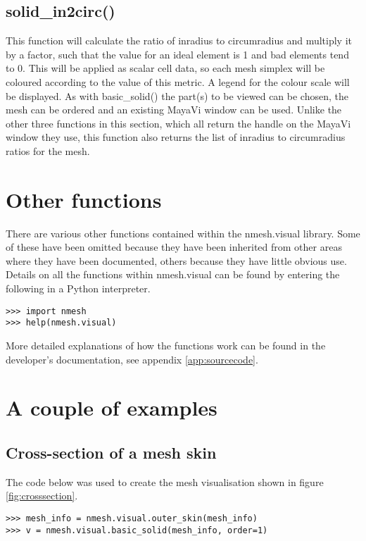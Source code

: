 \subsection{{\ttfamily solid\_in2circ()}}
This function will calculate the ratio of inradius to circumradius and multiply it by a factor, such that the value for an ideal element is 1 and bad elements tend to 0. This will be applied as scalar cell data, so each mesh simplex will be coloured according to the value of this metric. A legend for the colour scale will be displayed. As with {\ttfamily basic\_solid()} the part(s) to be viewed can be chosen, the mesh can be ordered and an existing MayaVi window can be used. Unlike the other three functions in this section, which all return the handle on the MayaVi window they use, this function also returns the list of inradius to circumradius ratios for the mesh.




\section{Other functions}
There are various other functions contained within the {\ttfamily nmesh.visual} library. Some of these have been omitted because they have been inherited from other areas where they have been documented, others because they have little obvious use. Details on all the functions within {\ttfamily nmesh.visual} can be found by entering the following in a Python interpreter.
\begin{lstlisting}[basicstyle=\small\ttfamily]
>>> import nmesh
>>> help(nmesh.visual)
\end{lstlisting}
More detailed explanations of how the functions work can be found in the developer's documentation, see appendix \ref{app:sourcecode}.




\section{A couple of examples}

\subsection{Cross-section of a mesh skin}
The code below was used to create the mesh visualisation shown in figure \ref{fig:crosssection}.

\begin{lstlisting}[basicstyle=\small\ttfamily]
>>> mesh_info = nmesh.visual.outer_skin(mesh_info)
>>> v = nmesh.visual.basic_solid(mesh_info, order=1)
\end{lstlisting}

